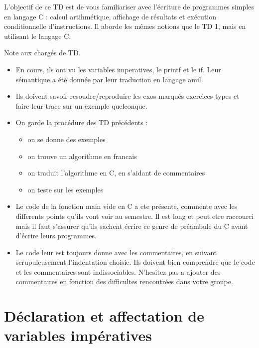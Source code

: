 
\newcommand{\commentaire}[1]{}


L'objectif de ce TD est de vous familiariser avec l'écriture de programmes simples en langage C : calcul artihmétique, affichage de résultats et exécution conditionnelle d'instructions. Il aborde les mêmes notions que le TD 1, mais en utilisant le langage C.

\begin{correction}
  Note aux chargés de TD.
  \begin{itemize}
  \item En cours, ils ont vu les variables imperatives, le printf et
    le if. Leur sémantique a été donnée par leur traduction en langage
    amil.
  \item Ils doivent savoir resoudre/reproduire les exos marqués exercices types et faire leur trace sur un exemple quelconque.
  \item On garde la procédure des TD précédents :
    \begin{itemize}
    \item on se donne des exemples
    \item on trouve un algorithme en francais
    \item on traduit l'algorithme en C, en s'aidant de commentaires
    \item on teste sur les exemples 
    \end{itemize}
  \item Le code de la fonction main vide en C a ete présente, commente avec les differents points qu'ils vont voir au semestre. Il est long et peut etre raccourci mais il faut s'assurer qu'ils sachent écrire ce genre de préambule du C avant d'écrire leurs programmes.
  \item Le code leur est toujours donne avec les commentaires, en suivant scrupuleusement l'indentation choisie. Ils doivent bien comprendre que le code et les commentaires sont indissociables. N'hesitez pas a ajouter des commentaires en fonction des difficultes rencontrées dans votre groupe.
  \end{itemize}
\end{correction}

\section{Déclaration et affectation de variables impératives}

